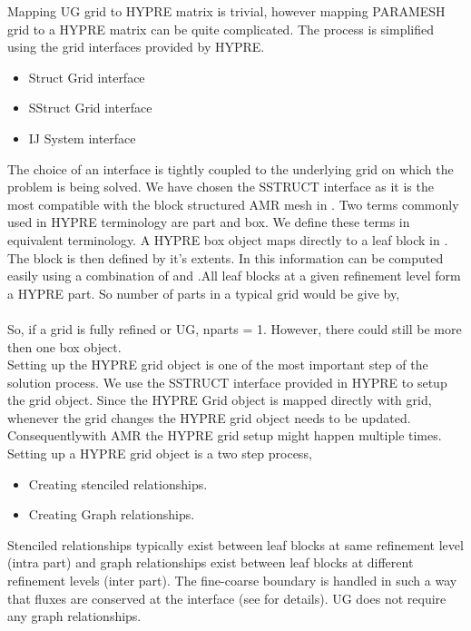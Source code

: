 Mapping UG grid to HYPRE matrix is trivial, however mapping PARAMESH grid to a HYPRE matrix can be quite complicated. The 
process is simplified using the grid interfaces provided by HYPRE.
\begin{itemize}
\item {Struct Grid interface}
\item {SStruct Grid interface}
\item {IJ System interface}
\end{itemize} 

The choice of an interface is tightly coupled to the underlying grid on which the problem is being solved. We have chosen the SSTRUCT 
interface as it is the most compatible with the block structured AMR mesh in \flashx. Two terms commonly used in HYPRE terminology 
are part and box. We define these terms in equivalent \flashx terminology. A HYPRE box object maps directly to a leaf block in \flashx. 
The block is then defined by it's extents. In \flashx this information can be computed easily using a combination of  
and .All leaf blocks at a given refinement level form a HYPRE part. So number of parts in a typical 
\flashx grid would be give by,  \\

 \\

So, if a grid is fully refined or UG, nparts = 1. However, there could still be more then one box object. \\

Setting up the HYPRE grid object is one of the most important step of the solution process. We use the SSTRUCT interface 
provided in HYPRE to setup the grid object. Since the HYPRE Grid object is mapped directly with \flashx grid, whenever the 
\flashx grid changes the HYPRE grid object needs to be updated. Consequentlywith AMR the HYPRE grid setup might happen multiple times. \\

Setting up a HYPRE grid object is a two step process, 
\begin{itemize}
\item Creating stenciled relationships.
\item Creating Graph relationships.
\end{itemize}

Stenciled relationships typically exist between leaf blocks at same refinement level (intra part) and graph relationships exist 
between leaf blocks at different refinement levels (inter part). The
fine-coarse boundary is handled in such a way that fluxes are
conserved at the interface (see  for details). UG
does not require any graph relationships. \\

